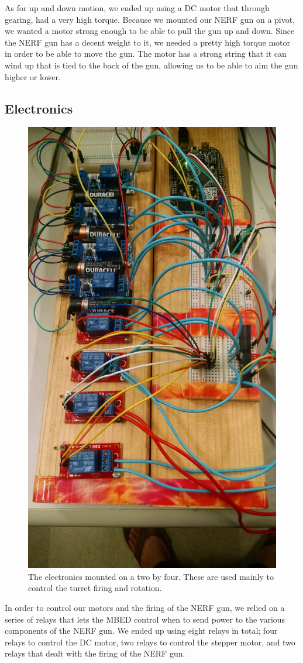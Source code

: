 \documentclass[journal]{IEEEtran}
\begin{document}
As for up and down motion, we ended up using a DC motor that through gearing, had a very high torque. Because we mounted our NERF gun on a pivot, we wanted a motor strong enough to be able to pull the gun up and down. Since the NERF gun has a decent weight to it, we needed a pretty high torque motor in order to be able to move the gun. The motor has a strong string that it can wind up that is tied to the back of the gun, allowing us to be able to aim the gun higher or lower.

\subsection{Electronics}

\begin{figure}[htbp]
    \centering
    \includegraphics[width=0.60\linewidth]{electronics.jpg}
    \caption{The electronics mounted on a two by four. These are used mainly to control the turret firing and rotation.}
    \label{fig:electronics}
\end{figure}

In order to control our motors and the firing of the NERF gun, we relied on a series of relays that lets the MBED control when to send power to the various components of the NERF gun. We ended up using eight relays in total; four relays to control the DC motor, two relays to control the stepper motor, and two relays that dealt with the firing of the NERF gun.
\end{document}
